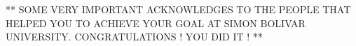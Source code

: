 \begin{agradecimientos}      

** SOME VERY IMPORTANT ACKNOWLEDGES TO THE PEOPLE THAT HELPED YOU TO ACHIEVE YOUR GOAL AT SIMON BOLIVAR UNIVERSITY. CONGRATULATIONS ! YOU DID IT ! **

\end{agradecimientos}
